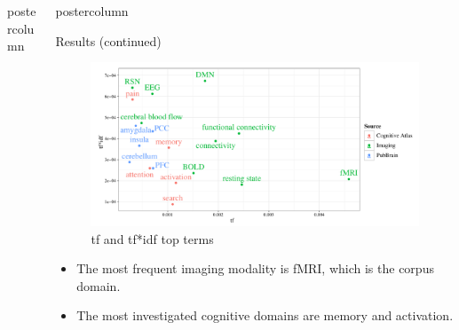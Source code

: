 \documentclass[final,hyperref={pdfpagelabels=false}]{beamer}
\newlength{\columnheight}
\begin{document}
\begin{frame}
\begin{columns}
\begin{column}{.5\textwidth}
\begin{beamercolorbox}[center,wd=\textwidth]{postercolumn}
\begin{minipage}[T]{.96\textwidth}
{            }
        \end{minipage}
      \end{beamercolorbox}
    \end{column}

    \begin{column}{.5\textwidth}
      \begin{beamercolorbox}[center,wd=\textwidth]{postercolumn}
        \begin{minipage}[T]{.96\textwidth} %
          \parbox[t][\columnheight]{\textwidth}{ %
            \begin{block}{Results (continued)}
                \begin{center}
                  \begin{figure}
                      \begin{center}
                          \includegraphics[width=.89\linewidth]{tfidf_100_v2.pdf}
                      \end{center}
                      \caption{\label{fig:citation_ranks}tf and tf*idf top terms}
                   \end{figure}
                \begin{itemize}
                \item The most frequent imaging modality is fMRI, which is the corpus domain.
                \item The most investigated cognitive domains are memory and activation. 

\end{itemize}
\end{center}
\end{block}}
\end{minipage}
\end{beamercolorbox}
\end{column}
\end{columns}
\end{frame}
\end{document}
